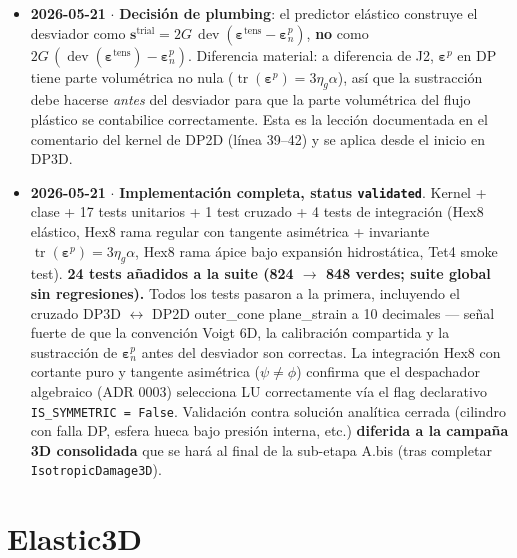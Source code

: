 \documentclass[11pt,letterpaper,oneside]{report}
\begin{document}
\begin{itemize}
  \item \textbf{2026-05-21} \ensuremath{\cdot} \textbf{Decisión de plumbing}: el predictor elástico construye el desviador como $\mathbf s^\text{trial} = 2G\,\operatorname{dev}(\boldsymbol\varepsilon^\text{tens} - \boldsymbol\varepsilon^p_n)$, \textbf{no} como $2G\,(\operatorname{dev}(\boldsymbol\varepsilon^\text{tens}) - \boldsymbol\varepsilon^p_n)$. Diferencia material: a diferencia de J2, $\boldsymbol\varepsilon^p$ en DP tiene parte volumétrica no nula ($\operatorname{tr}(\boldsymbol\varepsilon^p) = 3\eta_g\alpha$), así que la sustracción debe hacerse \textit{antes} del desviador para que la parte volumétrica del flujo plástico se contabilice correctamente. Esta es la lección documentada en el comentario del kernel de DP2D (línea 39--42) y se aplica desde el inicio en DP3D.
\end{itemize}

\begin{itemize}
  \item \textbf{2026-05-21} \ensuremath{\cdot} \textbf{Implementación completa, status \texttt{validated}}. Kernel + clase + 17 tests unitarios + 1 test cruzado + 4 tests de integración (Hex8 elástico, Hex8 rama regular con tangente asimétrica + invariante $\operatorname{tr}(\boldsymbol\varepsilon^p) = 3\eta_g\alpha$, Hex8 rama ápice bajo expansión hidrostática, Tet4 smoke test). \textbf{24 tests añadidos a la suite (824 \ensuremath{\to} 848 verdes; suite global sin regresiones).} Todos los tests pasaron a la primera, incluyendo el cruzado DP3D \ensuremath{\leftrightarrow} DP2D outer\_cone plane\_strain a 10 decimales --- señal fuerte de que la convención Voigt 6D, la calibración compartida y la sustracción de $\boldsymbol\varepsilon^p_n$ antes del desviador son correctas. La integración Hex8 con cortante puro y tangente asimétrica ($\psi \neq \phi$) confirma que el despachador algebraico (ADR 0003) selecciona LU correctamente vía el flag declarativo \texttt{IS\_SYMMETRIC = False}. Validación contra solución analítica cerrada (cilindro con falla DP, esfera hueca bajo presión interna, etc.) \textbf{diferida a la campaña 3D consolidada} que se hará al final de la sub-etapa A.bis (tras completar \texttt{IsotropicDamage3D}).
\end{itemize}


\newpage

\section{Elastic3D}
\end{document}
